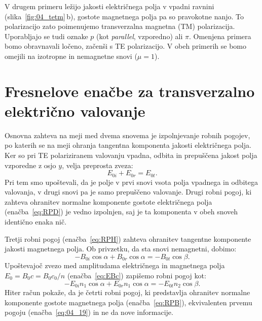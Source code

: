 V drugem primeru ležijo jakosti električnega polja v 
vpadni ravnini (slika~\ref{fig:04_tetm}\,b), gostote magnetnega polja 
pa so pravokotne nanjo. To polarizacijo zato poimenujemo 
transverzalna magnetna (TM) polarizacija. Uporabljajo se tudi oznake
$p$ (kot {\it parallel}, vzporedno) ali $\pi$. 
Omenjena primera bomo obravnavali ločeno, začenši s TE polarizacijo. V 
obeh primerih se bomo omejili na izotropne in nemagnetne snovi ($\mu=1$).

\section{Fresnelove enačbe za transverzalno električno valovanje}
Osnovna zahteva na meji med dvema snovema je izpolnjevanje robnih
pogojev, po katerih se na meji ohranja tangentna komponenta jakosti električnega
polja. Ker so pri TE polariziranem valovanju 
vpadna, odbita in prepuščena jakost polja vzporedne z osjo $y$, velja preprosta zveza:
\begin{equation}
E_{0i} + E_{0r}= E_{0t}.
\label{eq:04_19}
\end{equation}
Pri tem smo upoštevali, da je polje v prvi snovi vsota polja vpadnega in odbitega
valovanja, v drugi snovi pa je samo prepuščeno valovanje. Drugi robni pogoj, ki zahteva
ohranitev normalne komponente gostote električnega polja (enačba~\ref{eq:RPD}) je 
vedno izpolnjen, saj je ta komponenta v obeh snoveh identično enaka nič. 

Tretji robni pogoj (enačba~\ref{eq:RPH}) zahteva
ohranitev tangentne komponente jakosti magnetnega polja. Ob privzetku, da
sta snovi nemagnetni, dobimo:
\begin{equation}
-B_{0i}\cos \alpha + B_{0r}\cos \alpha = -B_{0t}\cos \beta.
\label{eq:04_20}
\end{equation}
Upoštevajoč zvezo med amplitudama električnega in magnetnega 
polja $E_0 = B_0 c = B_0 c_0/n$  (enačba~\ref{eq:EBc}) zapišemo robni pogoj kot:
\begin{equation}
- E_{0i}n_1\cos \alpha + E_{0r}n_1\cos \alpha = - E_{0t}n_2\cos \beta.
\label{eq:04_21}
\end{equation} 
Hiter račun pokaže, da je četrti robni pogoj, ki predstavlja ohranitev 
normalne komponente gostote magnetnega polja (enačba~\ref{eq:RPB}), 
ekvivalenten prvemu pogoju (enačba~\ref{eq:04_19}) in ne da nove informacije. 

